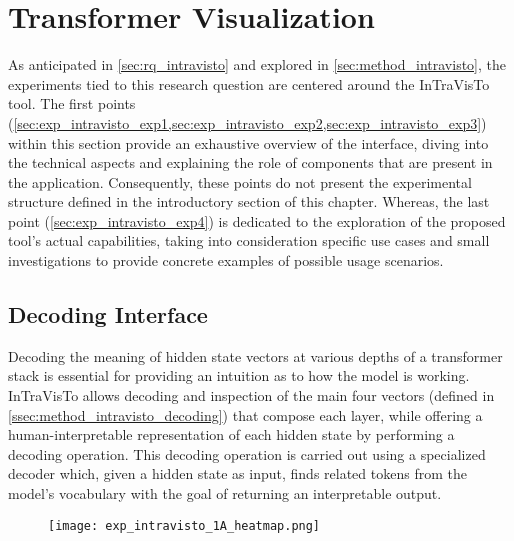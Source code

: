 \section{Transformer Visualization}\label{sec:exp_intravisto}

As anticipated in \cref{sec:rq_intravisto} and explored in \cref{sec:method_intravisto}, the experiments tied to this research question are centered around the InTraVisTo tool.
The first points (\cref{sec:exp_intravisto_exp1,sec:exp_intravisto_exp2,sec:exp_intravisto_exp3}) within this section provide an exhaustive overview of the interface, diving into the technical aspects and explaining the role of components that are present in the application.
Consequently, these points do not present the experimental structure defined in the introductory section of this chapter.
Whereas, the last point (\cref{sec:exp_intravisto_exp4}) is dedicated to the exploration of the proposed tool's actual capabilities, taking into consideration specific use cases and small investigations to provide concrete examples of possible usage scenarios.

\subsection{Decoding Interface}\label{sec:exp_intravisto_exp1}

Decoding the meaning of hidden state vectors at various depths of a transformer stack is essential for providing an intuition as to how the model is working.
InTraVisTo allows decoding and inspection of the main four vectors (defined in \cref{ssec:method_intravisto_decoding}) that compose each layer, while offering a human-interpretable representation of each hidden state by performing a decoding operation.
This decoding operation is carried out using a specialized decoder which, given a hidden state as input, finds related tokens from the model's vocabulary with the goal of returning an interpretable output.

\begin{figure}[t!]
    \centering
    \texttt{[image: exp\_intravisto\_1A\_heatmap.png]}
    \caption{}
    \label{fig:exp_intravisto_1_A}
\end{figure}

